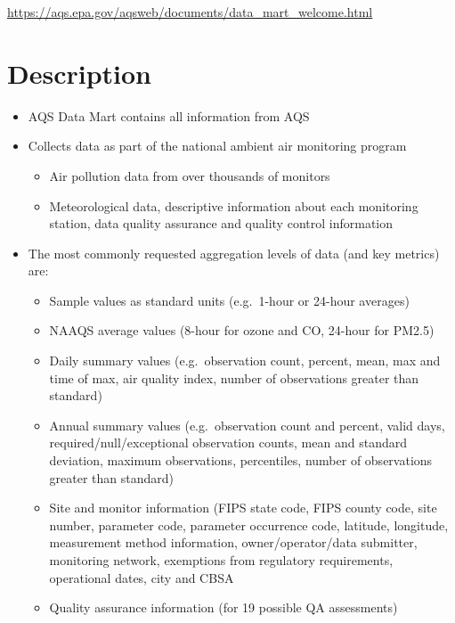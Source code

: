 \documentclass[
]{book}
\providecommand{\tightlist}{%
  \setlength{\itemsep}{0pt}\setlength{\parskip}{0pt}}
\begin{document}
\url{https://aqs.epa.gov/aqsweb/documents/data_mart_welcome.html}

\hypertarget{description-1}{%
\section{Description}\label{description-1}}

\begin{itemize}
\tightlist
\item
  AQS Data Mart contains all information from AQS
\item
  Collects data as part of the national ambient air monitoring program

  \begin{itemize}
  \tightlist
  \item
    Air pollution data from over thousands of monitors
  \item
    Meteorological data, descriptive information about each monitoring station, data quality assurance and quality control information
  \end{itemize}
\item
  The most commonly requested aggregation levels of data (and key metrics) are:

  \begin{itemize}
  \tightlist
  \item
    Sample values as standard units (e.g.~1-hour or 24-hour averages)
  \item
    NAAQS average values (8-hour for ozone and CO, 24-hour for PM2.5)
  \item
    Daily summary values (e.g.~observation count, percent, mean, max and time of max, air quality index, number of observations greater than standard)
  \item
    Annual summary values (e.g.~observation count and percent, valid days, required/null/exceptional observation counts, mean and standard deviation, maximum observations, percentiles, number of observations greater than standard)
  \item
    Site and monitor information (FIPS state code, FIPS county code, site number, parameter code, parameter occurrence code, latitude, longitude, measurement method information, owner/operator/data submitter, monitoring network, exemptions from regulatory requirements, operational dates, city and CBSA
  \item
    Quality assurance information (for 19 possible QA assessments)
  \end{itemize}
\end{itemize}
\end{document}

